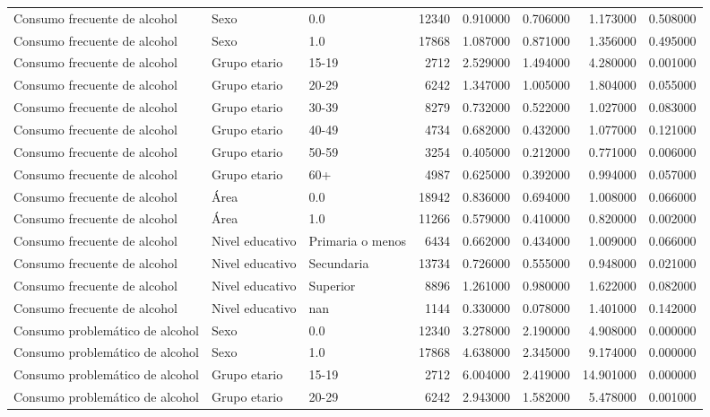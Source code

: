 \begin{longtable}{lllrrrrr}
Consumo frecuente de alcohol & Sexo & 0.0 & 12340 & 0.910000 & 0.706000 & 1.173000 & 0.508000 \\
Consumo frecuente de alcohol & Sexo & 1.0 & 17868 & 1.087000 & 0.871000 & 1.356000 & 0.495000 \\
Consumo frecuente de alcohol & Grupo etario & 15-19 & 2712 & 2.529000 & 1.494000 & 4.280000 & 0.001000 \\
Consumo frecuente de alcohol & Grupo etario & 20-29 & 6242 & 1.347000 & 1.005000 & 1.804000 & 0.055000 \\
Consumo frecuente de alcohol & Grupo etario & 30-39 & 8279 & 0.732000 & 0.522000 & 1.027000 & 0.083000 \\
Consumo frecuente de alcohol & Grupo etario & 40-49 & 4734 & 0.682000 & 0.432000 & 1.077000 & 0.121000 \\
Consumo frecuente de alcohol & Grupo etario & 50-59 & 3254 & 0.405000 & 0.212000 & 0.771000 & 0.006000 \\
Consumo frecuente de alcohol & Grupo etario & 60+ & 4987 & 0.625000 & 0.392000 & 0.994000 & 0.057000 \\
Consumo frecuente de alcohol & Área & 0.0 & 18942 & 0.836000 & 0.694000 & 1.008000 & 0.066000 \\
Consumo frecuente de alcohol & Área & 1.0 & 11266 & 0.579000 & 0.410000 & 0.820000 & 0.002000 \\
Consumo frecuente de alcohol & Nivel educativo & Primaria o menos & 6434 & 0.662000 & 0.434000 & 1.009000 & 0.066000 \\
Consumo frecuente de alcohol & Nivel educativo & Secundaria & 13734 & 0.726000 & 0.555000 & 0.948000 & 0.021000 \\
Consumo frecuente de alcohol & Nivel educativo & Superior & 8896 & 1.261000 & 0.980000 & 1.622000 & 0.082000 \\
Consumo frecuente de alcohol & Nivel educativo & nan & 1144 & 0.330000 & 0.078000 & 1.401000 & 0.142000 \\
Consumo problemático de alcohol & Sexo & 0.0 & 12340 & 3.278000 & 2.190000 & 4.908000 & 0.000000 \\
Consumo problemático de alcohol & Sexo & 1.0 & 17868 & 4.638000 & 2.345000 & 9.174000 & 0.000000 \\
Consumo problemático de alcohol & Grupo etario & 15-19 & 2712 & 6.004000 & 2.419000 & 14.901000 & 0.000000 \\
Consumo problemático de alcohol & Grupo etario & 20-29 & 6242 & 2.943000 & 1.582000 & 5.478000 & 0.001000 \\

\end{longtable}
